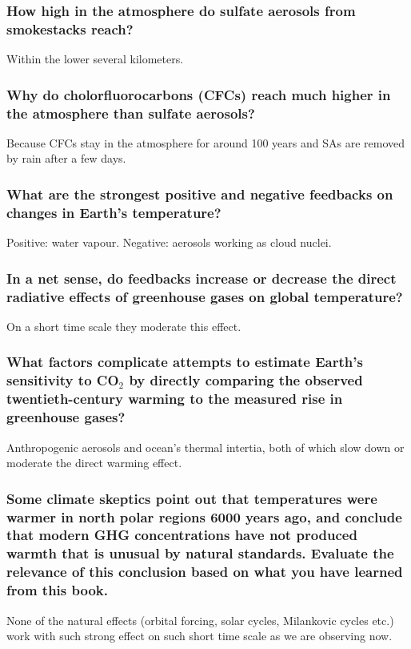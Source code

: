 \subsubsection{How high in the atmosphere do sulfate aerosols from smokestacks
reach?}

Within the lower several kilometers.

\subsubsection{Why do cholorfluorocarbons (CFCs) reach much higher in the
atmosphere than sulfate aerosols?}

Because CFCs stay in the atmosphere for around 100 years and SAs are removed by
rain after a few days.

\subsubsection{What are the strongest positive and negative feedbacks on
changes in Earth's temperature?}

Positive: water vapour. Negative: aerosols working as cloud nuclei.

\subsubsection{In a net sense, do feedbacks increase or decrease the direct
radiative effects of greenhouse gases on global temperature?}

On a short time scale they moderate this effect.

\subsubsection{What factors complicate attempts to estimate Earth's sensitivity
to CO$_2$ by directly comparing the observed twentieth-century warming to the
measured rise in greenhouse gases?}

Anthropogenic aerosols and ocean's thermal intertia, both of which slow down
or moderate the direct warming effect.

\subsubsection{Some climate skeptics point out that temperatures were warmer in
north polar regions 6000 years ago, and conclude that modern GHG concentrations
have not produced warmth that is unusual by natural standards. Evaluate the
relevance of this conclusion based on what you have learned from this book.}

None of the natural effects (orbital forcing, solar cycles, Milankovic cycles
etc.) work with such strong effect on such short time scale as we are observing
now.
